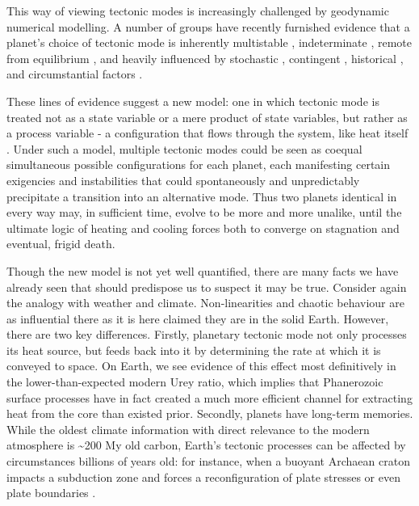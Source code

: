 \documentclass[a4paper,11pt,oneside]{book}
\begin{document}
This way of viewing tectonic modes is increasingly challenged by geodynamic numerical modelling. A number of groups have recently furnished evidence that a planet's choice of tectonic mode is inherently multistable \citet{Pla2009-xm, Weller2015-ci, Lenardic2016-qg}, indeterminate \cite{Lenardic2012-bz}, remote from equilibrium \cite{Weller2015-ci}, and heavily influenced by stochastic \cite{Lenardic2016-ue}, contingent \citet{ONeill2015-iz, ONeill2016-tq}, historical \cite{Weller2012-cx}, and circumstantial factors \citet{Glukhovskii2015-nr, ONeill2017-em, ONeill2018-hy}.

These lines of evidence suggest a new model: one in which tectonic mode is treated not as a state variable or a mere product of state variables, but rather as a process variable - a configuration that flows through the system, like heat itself \cite{Lenardic2018-zb}. Under such a model, multiple tectonic modes could be seen as coequal simultaneous possible configurations for each planet, each manifesting certain exigencies and instabilities that could spontaneously and unpredictably precipitate a transition into an alternative mode. Thus two planets identical in every way may, in sufficient time, evolve to be more and more unalike, until the ultimate logic of heating and cooling forces both to converge on stagnation and eventual, frigid death.

Though the new model is not yet well quantified, there are many facts we have already seen that should predispose us to suspect it may be true. Consider again the analogy with weather and climate. Non-linearities and chaotic behaviour are as influential there as it is here claimed they are in the solid Earth. However, there are two key differences. Firstly, planetary tectonic mode not only processes its heat source, but feeds back into it by determining the rate at which it is conveyed to space. On Earth, we see evidence of this effect most definitively in the lower-than-expected modern Urey ratio, which implies that Phanerozoic surface processes have in fact created a much more efficient channel for extracting heat from the core than existed prior. Secondly, planets have long-term memories. While the oldest climate information with direct relevance to the modern atmosphere is {\textasciitilde}200 My old carbon, Earth's tectonic processes can be affected by circumstances billions of years old: for instance, when a buoyant Archaean craton impacts a subduction zone and forces a reconfiguration of plate stresses or even plate boundaries \cite{Mason2010-ym}.
\end{document}
